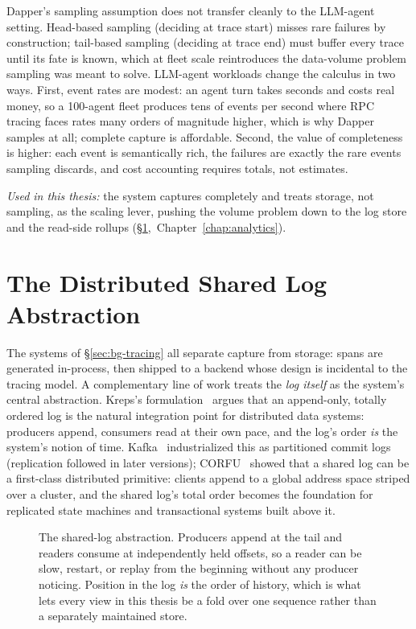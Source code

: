 Dapper's sampling assumption does not transfer cleanly to the LLM-agent
setting. Head-based sampling (deciding at trace start) misses rare failures
by construction; tail-based sampling (deciding at trace end) must buffer
every trace until its fate is known, which at fleet scale reintroduces the
data-volume problem sampling was meant to solve. LLM-agent workloads change
the calculus in two ways. First, event rates are modest: an agent turn takes
seconds and costs real money, so a 100-agent fleet produces tens of events
per second where RPC tracing faces rates many orders of magnitude higher,
which is why Dapper samples at all; complete capture is affordable. Second,
the value of completeness is higher: each event is semantically rich, the
failures are exactly the rare events sampling discards, and cost accounting
requires totals, not estimates.

\emph{Used in this thesis:} the system captures completely and treats
storage, not sampling, as the scaling lever, pushing the volume problem
down to the log store and the read-side rollups
(\S\ref{sec:bg-log},~Chapter~\ref{chap:analytics}).

\section{The Distributed Shared Log Abstraction}
\label{sec:bg-log}

The systems of \S\ref{sec:bg-tracing} all separate capture from storage: spans
are generated in-process, then shipped to a backend whose design is
incidental to the tracing model. A complementary line of work treats the
\emph{log itself} as the system's central abstraction. Kreps's
formulation~\cite{kreps2013log} argues that an append-only, totally ordered
log is the natural integration point for distributed data systems: producers
append, consumers read at their own pace, and the log's order \emph{is} the
system's notion of time.
Kafka~\cite{kreps2011kafka} industrialized this as
partitioned commit logs (replication followed in later versions); CORFU~\cite{balakrishnan2012corfu}
showed that a shared log can be a first-class distributed primitive:
clients append to a global address space striped over a cluster, and the
shared log's total order becomes the foundation for replicated state
machines and transactional systems built above it.

\begin{figure}[t]
  \centering
  \resizebox{0.84\linewidth}{!}{}
  \caption[The shared-log abstraction]{The shared-log abstraction. Producers
  append at the tail and readers consume at independently held offsets, so a
  reader can be slow, restart, or replay from the beginning without any
  producer noticing. Position in the log \emph{is} the order of history,
  which is what lets every view in this thesis be a fold over one sequence
  rather than a separately maintained store.}
  \label{fig:sharedlog}
\end{figure}

